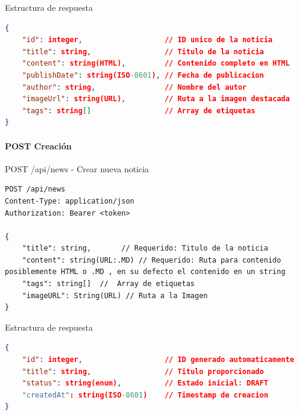 \documentclass[11pt,a4paper]{article}
\begin{document}
\begin{center}
	\begin{minipage}{\textwidth}
		\begin{codebox}{Estructura de respuesta}
			\begin{lstlisting}[language=json]
{
    "id": integer,                   // ID unico de la noticia
    "title": string,                 // Titulo de la noticia
    "content": string(HTML),         // Contenido completo en HTML
    "publishDate": string(ISO-8601), // Fecha de publicacion
    "author": string,                // Nombre del autor
    "imageUrl": string(URL),         // Ruta a la imagen destacada
    "tags": string[]                 // Array de etiquetas
}
\end{lstlisting}
		\end{codebox}
	\end{minipage}
\end{center}

\paragraph{POST Creación}
\begin{center}
	\begin{minipage}{\textwidth}
		\begin{codebox}{POST /api/news - Crear nueva noticia}
			\begin{lstlisting}[language=HTTP]
POST /api/news
Content-Type: application/json
Authorization: Bearer <token>

{
    "title": string,       // Requerido: Titulo de la noticia
    "content": string(URL:.MD) // Requerido: Ruta para contenido posiblemente HTML o .MD , en su defecto el contenido en un string
    "tags": string[]  //  Array de etiquetas 
    "imageURL": String(URL) // Ruta a la Imagen
}
\end{lstlisting}
		\end{codebox}
	\end{minipage}
\end{center}

\begin{center}
	\begin{minipage}{\textwidth}
		\begin{codebox}{Estructura de respuesta}
			\begin{lstlisting}[language=json]
{
    "id": integer,                   // ID generado automaticamente
    "title": string,                 // Titulo proporcionado
    "status": string(enum),          // Estado inicial: DRAFT
    "createdAt": string(ISO-8601)    // Timestamp de creacion
}
\end{lstlisting}
		\end{codebox}
	\end{minipage}
\end{center}
\end{document}
